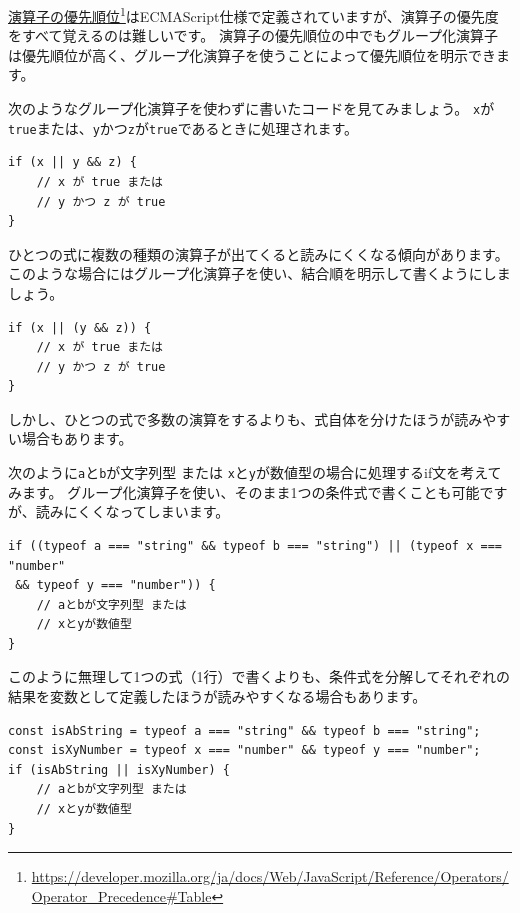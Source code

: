 \href{https://developer.mozilla.org/ja/docs/Web/JavaScript/Reference/Operators/Operator_Precedence\#Table}{演算子の優先順位}\footnote{\url{https://developer.mozilla.org/ja/docs/Web/JavaScript/Reference/Operators/Operator_Precedence\#Table}}はECMAScript仕様で定義されていますが、演算子の優先度をすべて覚えるのは難しいです。
演算子の優先順位の中でもグループ化演算子は優先順位が高く、グループ化演算子を使うことによって優先順位を明示できます。

次のようなグループ化演算子を使わずに書いたコードを見てみましょう。
\texttt{x}が\texttt{true}または、\texttt{y}かつ\texttt{z}が\texttt{true}であるときに処理されます。

\begin{lstlisting}
if (x || y && z) {
    // x が true または
    // y かつ z が true
}
\end{lstlisting}

ひとつの式に複数の種類の演算子が出てくると読みにくくなる傾向があります。
このような場合にはグループ化演算子を使い、結合順を明示して書くようにしましょう。

\begin{lstlisting}
if (x || (y && z)) {
    // x が true または
    // y かつ z が true
}
\end{lstlisting}

しかし、ひとつの式で多数の演算をするよりも、式自体を分けたほうが読みやすい場合もあります。

次のように\texttt{a}と\texttt{b}が文字列型
または
\texttt{x}と\texttt{y}が数値型の場合に処理するif文を考えてみます。
グループ化演算子を使い、そのまま1つの条件式で書くことも可能ですが、読みにくくなってしまいます。

\enlargethispage{\baselineskip}\begin{lstlisting}
if ((typeof a === "string" && typeof b === "string") || (typeof x === "number"
 && typeof y === "number")) {
    // aとbが文字列型 または
    // xとyが数値型
}
\end{lstlisting}

このように無理して1つの式（1行）で書くよりも、条件式を分解してそれぞれの結果を変数として定義したほうが読みやすくなる場合もあります。

\begin{lstlisting}
const isAbString = typeof a === "string" && typeof b === "string";
const isXyNumber = typeof x === "number" && typeof y === "number";
if (isAbString || isXyNumber) {
    // aとbが文字列型 または
    // xとyが数値型
}
\end{lstlisting}

